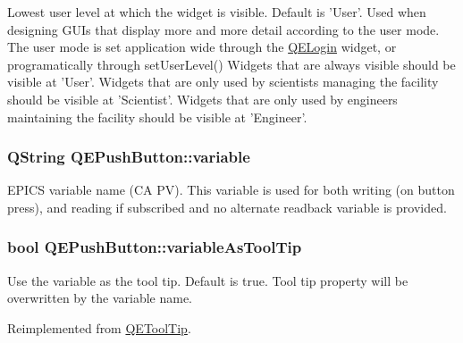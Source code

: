 \label{classQEPushButton_ad95a2bf16f07fbb22fb66bb8e61c02d1}
Lowest user level at which the widget is visible. Default is 'User'. Used when designing GUIs that display more and more detail according to the user mode. The user mode is set application wide through the \hyperlink{classQELogin}{QELogin} widget, or programatically through setUserLevel() Widgets that are always visible should be visible at 'User'. Widgets that are only used by scientists managing the facility should be visible at 'Scientist'. Widgets that are only used by engineers maintaining the facility should be visible at 'Engineer'. \hypertarget{classQEPushButton_adb5a937357068be51507e62e18921561}{
\subsubsection[{variable}]{\setlength{\rightskip}{0pt plus 5cm}QString QEPushButton::variable}}
\label{classQEPushButton_adb5a937357068be51507e62e18921561}
EPICS variable name (CA PV). This variable is used for both writing (on button press), and reading if subscribed and no alternate readback variable is provided. \hypertarget{classQEPushButton_a4c9ac62a902c4684eac2c18891f776d4}{
\subsubsection[{variableAsToolTip}]{\setlength{\rightskip}{0pt plus 5cm}bool QEPushButton::variableAsToolTip}}
\label{classQEPushButton_a4c9ac62a902c4684eac2c18891f776d4}
Use the variable as the tool tip. Default is true. Tool tip property will be overwritten by the variable name. 

Reimplemented from \hyperlink{classQEToolTip}{QEToolTip}.

